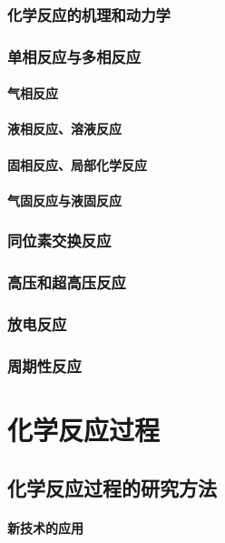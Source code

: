 \documentclass[UTF8]{../03-Chemistry}
\begin{document}
\subsection{化学反应的机理和动力学}
\subsection{单相反应与多相反应}
    \subsubsection{气相反应}
    \subsubsection{液相反应、溶液反应}
    \subsubsection{固相反应、局部化学反应}
    \subsubsection{气固反应与液固反应}
\subsection{同位素交换反应}
\subsection{高压和超高压反应}
\subsection{放电反应}
\subsection{周期性反应}




\chapter{化学反应过程}

\section{化学反应过程的研究方法}
    \subsubsection{新技术的应用}
\end{document}
